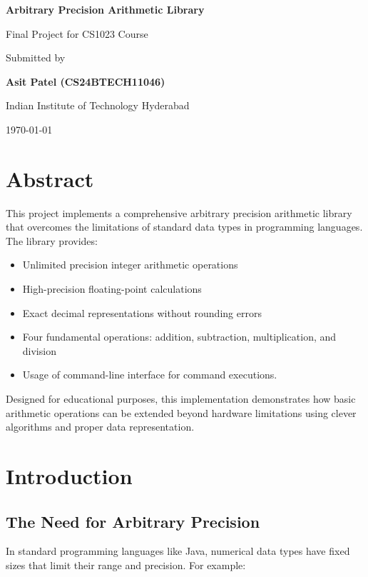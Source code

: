 \documentclass{article}
\begin{document}
\begin{titlepage}
    \centering
    \vspace*{2cm}
    {\Huge\bfseries Arbitrary Precision Arithmetic Library\par}
    \vspace{1cm}
    {\Large Final Project for CS1023 Course\par}
    \vspace{2cm}
    {\Large Submitted by\par}
    {\Large\bfseries Asit Patel (CS24BTECH11046)\par}
    \vspace{0.5cm}
    \vspace{1cm}
    {\Large Indian Institute of Technology Hyderabad\par}
    \vfill
    {\large \today\par}
\end{titlepage}

\tableofcontents
\newpage

\section{Abstract}
This project implements a comprehensive arbitrary precision arithmetic library that overcomes the limitations of standard data types in programming languages. The library provides:

\begin{itemize}
    \item Unlimited precision integer arithmetic operations
    \item High-precision floating-point calculations
    \item Exact decimal representations without rounding errors
    \item Four fundamental operations: addition, subtraction, multiplication, and division
    \item Usage of command-line interface for command executions.
\end{itemize}

Designed for educational purposes, this implementation demonstrates how basic arithmetic operations can be extended beyond hardware limitations using clever algorithms and proper data representation.

\section{Introduction}
\subsection{The Need for Arbitrary Precision}
In standard programming languages like Java, numerical data types have fixed sizes that limit their range and precision. For example:
\end{document}
